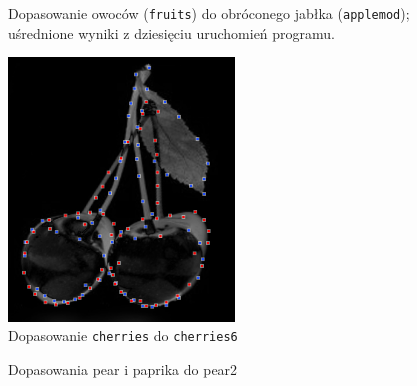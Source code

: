 \documentclass[a4paper,12pt,leqno]{article}
\begin{document}
\begin{figure}\centering
\footnotesize\vspace{-2em}
\normalsize\caption{Dopasowanie owoców (\texttt{fruits}) do obróconego jabłka (\texttt{applemod}); uśrednione wyniki z dziesięciu uruchomień programu.}
\end{figure} 

\begin{figure}\centering
\includegraphics[width=6cm,keepaspectratio=true]{./cherries-match.png}
\caption{Dopasowanie \texttt{cherries} do \texttt{cherries6}}
\end{figure}

\begin{figure}\centering
{}
\caption{Dopasowania pear i paprika do pear2}
\end{figure}
\end{document}
